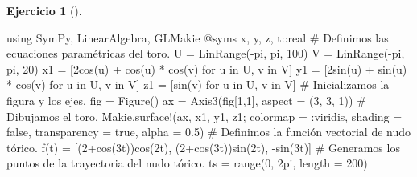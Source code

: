 \documentclass[
  a4paper,
]{scrreport}
\newenvironment{Shaded}{\begin{snugshade}}{\end{snugshade}}
\newcommand{\BuiltInTok}[1]{\textcolor[rgb]{0.00,0.23,0.31}{#1}}
\newcommand{\CommentTok}[1]{\textcolor[rgb]{0.37,0.37,0.37}{#1}}
\newcommand{\ConstantTok}[1]{\textcolor[rgb]{0.56,0.35,0.01}{#1}}
\newcommand{\DataTypeTok}[1]{\textcolor[rgb]{0.68,0.00,0.00}{#1}}
\newcommand{\FloatTok}[1]{\textcolor[rgb]{0.68,0.00,0.00}{#1}}
\newcommand{\FunctionTok}[1]{\textcolor[rgb]{0.28,0.35,0.67}{#1}}
\newcommand{\ImportTok}[1]{\textcolor[rgb]{0.00,0.46,0.62}{#1}}
\newcommand{\KeywordTok}[1]{\textcolor[rgb]{0.00,0.23,0.31}{#1}}
\newcommand{\NormalTok}[1]{\textcolor[rgb]{0.00,0.23,0.31}{#1}}
\newcommand{\OperatorTok}[1]{\textcolor[rgb]{0.37,0.37,0.37}{#1}}
\newcommand{\PreprocessorTok}[1]{\textcolor[rgb]{0.68,0.00,0.00}{#1}}
\theoremstyle{definition}
\newtheorem{exercise}{Ejercicio}[chapter]
\theoremstyle{remark}
\begin{document}
\begin{exercise}[]
\begin{tcolorbox}
\begin{Shaded}
\begin{Highlighting}[]
\ImportTok{using} \BuiltInTok{SymPy}\NormalTok{, }\BuiltInTok{LinearAlgebra}\NormalTok{, }\BuiltInTok{GLMakie}
\PreprocessorTok{@syms}\NormalTok{ x, y, z, t}\OperatorTok{::}\DataTypeTok{real}
\CommentTok{\# Definimos las ecuaciones paramétricas del toro.}
\NormalTok{U }\OperatorTok{=} \FunctionTok{LinRange}\NormalTok{(}\OperatorTok{{-}}\ConstantTok{pi}\NormalTok{, }\ConstantTok{pi}\NormalTok{, }\FloatTok{100}\NormalTok{)}
\NormalTok{V }\OperatorTok{=} \FunctionTok{LinRange}\NormalTok{(}\OperatorTok{{-}}\ConstantTok{pi}\NormalTok{, }\ConstantTok{pi}\NormalTok{, }\FloatTok{20}\NormalTok{)}
\NormalTok{x1 }\OperatorTok{=}\NormalTok{ [}\FloatTok{2}\FunctionTok{cos}\NormalTok{(u) }\OperatorTok{+} \FunctionTok{cos}\NormalTok{(u) }\OperatorTok{*} \FunctionTok{cos}\NormalTok{(v) for u }\KeywordTok{in}\NormalTok{ U, v }\KeywordTok{in}\NormalTok{ V]}
\NormalTok{y1 }\OperatorTok{=}\NormalTok{ [}\FloatTok{2}\FunctionTok{sin}\NormalTok{(u) }\OperatorTok{+} \FunctionTok{sin}\NormalTok{(u) }\OperatorTok{*} \FunctionTok{cos}\NormalTok{(v) for u }\KeywordTok{in}\NormalTok{ U, v }\KeywordTok{in}\NormalTok{ V]}
\NormalTok{z1 }\OperatorTok{=}\NormalTok{ [}\FunctionTok{sin}\NormalTok{(v) for u }\KeywordTok{in}\NormalTok{ U, v }\KeywordTok{in}\NormalTok{ V]}
\CommentTok{\# Inicializamos la figura y los ejes.}
\NormalTok{fig }\OperatorTok{=} \FunctionTok{Figure}\NormalTok{()}
\NormalTok{ax }\OperatorTok{=} \FunctionTok{Axis3}\NormalTok{(fig[}\FloatTok{1}\NormalTok{,}\FloatTok{1}\NormalTok{], aspect }\OperatorTok{=}\NormalTok{ (}\FloatTok{3}\NormalTok{, }\FloatTok{3}\NormalTok{, }\FloatTok{1}\NormalTok{))}
\CommentTok{\# Dibujamos el toro.}
\NormalTok{Makie.}\FunctionTok{surface!}\NormalTok{(ax, x1, y1, z1; colormap }\OperatorTok{=} \OperatorTok{:}\NormalTok{viridis, shading }\OperatorTok{=} \ConstantTok{false}\NormalTok{, transparency }\OperatorTok{=} \ConstantTok{true}\NormalTok{, alpha }\OperatorTok{=} \FloatTok{0.5}\NormalTok{)}
\CommentTok{\# Definimos la función vectorial de nudo tórico.}
\FunctionTok{f}\NormalTok{(t) }\OperatorTok{=}\NormalTok{ [(}\FloatTok{2}\FunctionTok{+cos}\NormalTok{(}\FloatTok{3}\NormalTok{t))}\FunctionTok{cos}\NormalTok{(}\FloatTok{2}\NormalTok{t), (}\FloatTok{2}\FunctionTok{+cos}\NormalTok{(}\FloatTok{3}\NormalTok{t))}\FunctionTok{sin}\NormalTok{(}\FloatTok{2}\NormalTok{t), }\FunctionTok{{-}sin}\NormalTok{(}\FloatTok{3}\NormalTok{t)] }
\CommentTok{\# Generamos los puntos de la trayectoria del nudo tórico.}
\NormalTok{ts }\OperatorTok{=} \FunctionTok{range}\NormalTok{(}\FloatTok{0}\NormalTok{, }\FloatTok{2}\NormalTok{pi, length }\OperatorTok{=} \FloatTok{200}\NormalTok{)}

\end{Highlighting}
\end{Shaded}
\end{tcolorbox}
\end{exercise}
\end{document}
